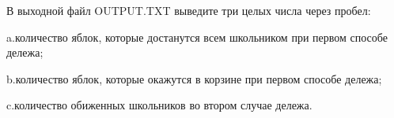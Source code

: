 В выходной файл OUTPUT.TXT выведите три целых числа через пробел:

a.количество яблок, которые достанутся всем школьником при первом способе дележа;

b.количество яблок, которые окажутся в корзине при первом способе дележа;

c.количество обиженных школьников во втором случае дележа.